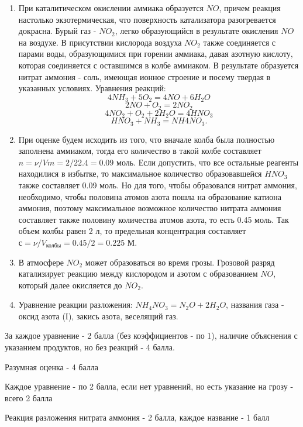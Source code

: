 \solutionSection

\begin{enumerate}
    \item При каталитическом окислении аммиака образуется $NO$, причем реакция настолько экзотермическая, 
    что поверхность катализатора разогревается докрасна. Бурый газ - $NO_2$, легко образующийся в 
    результате окисления $NO$ на воздухе. В присутствии кислорода воздуха $NO_2$ также соединяется с парами воды, 
    образующимися при горении аммиака, давая азотную кислоту, которая соединяется с оставшимся в колбе аммиаком. 
    В результате образуется нитрат аммония - соль, имеющая ионное строение и посему твердая в указанных условиях.
    Уравнения реакций:
    $$4NH_3 + 5O_2 = 4NO + 6H_2O$$
    $$2NO + O_2 = 2NO_2$$
    $$4NO_2 + O_2 + 2H_2O = 4HNO_3$$
    $$HNO_3 + NH_3 = NH4NO_3.$$
    \item При оценке будем исходить из того, что вначале колба была полностью заполнена аммиаком, тогда его количество в такой 
    колбе составляет $n = \nu/Vm = 2/22.4 = 0.09$ моль. Если допустить, что все остальные реагенты находилися в 
    избытке, то максимальное количество образовавшейся $HNO_3$ также составляет 0.09 моль. Но для того, чтобы 
    образовался нитрат аммония, необходимо, чтобы половина атомов азота пошла на образование катиона аммония, 
    поэтому максимальное возможное количество нитрата аммония составляет также половину количества атомов азота, 
    то есть 0.45 моль. Так объем колбы равен 2 л, то предельная концентрация составляет $с = \nu/V_{\text{колбы}}=0.45/2 = 0.225$ М.
    \item В атмосфере $NO_2$ может образоваться во время грозы. Грозовой разряд катализирует реакцию между кислородом и азотом с образованием $NO$, 
    который далее окисляется до $NO_2$.
    \item Уравнение реакции разложения:  $NH_4NO_3 = N_2O + 2H_2O$, названия газа - оксид азота (I), закись азота, 
    веселящий газ.
\end{enumerate}

За каждое уравнение - 2 балла (без коэффициентов - по 1), наличие объяснения с указанием продуктов, но без реакций - 4 балла.

Разумная оценка - 4 балла

Каждое уравнение - по 2 балла, если нет уравнений, но есть указание на грозу - всего 2 балла

Реакция разложения нитрата аммония - 2 балла, каждое название - 1 балл
